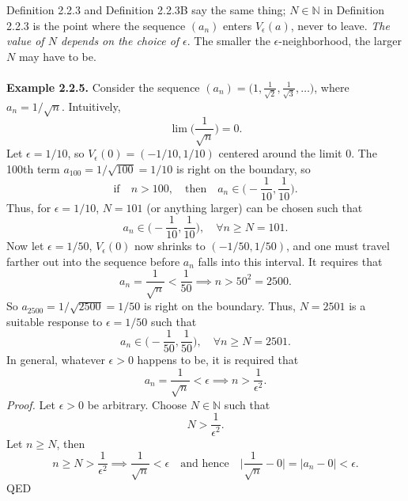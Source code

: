 \documentclass{article}
\begin{document}
            Definition 2.2.3 and Definition 2.2.3B say the same thing; $N \in \mathbb{N}$ in Definition 2.2.3 is the point where the sequence $(a_n)$ enters $V_\epsilon(a)$, never to leave. \textit{The value of $N$ depends on the choice of $\epsilon$}. The smaller the $\epsilon$-neighborhood, the larger $N$ may have to be.\\ \\
            \textbf{Example 2.2.5.} Consider the sequence $(a_n)=\big(1,\frac{1}{\sqrt{2}},\frac{1}{\sqrt{3}},\dots\big)$, where $a_n=1/\sqrt{n}$. Intuitively,
            \begin{equation*}
                \lim \bigg(\frac{1}{\sqrt{n}}\bigg) = 0.
            \end{equation*}
            Let $\epsilon=1/10$, so $V_\epsilon(0)=(-1/10,1/10)$ centered around the limit 0. The 100th term $a_{100} = 1/\sqrt{100}=1/10$ is right on the boundary, so
            \begin{equation*}
                \text{if} \quad n>100, \quad \text{then} \quad a_n \in \bigg(-\frac{1}{10},\frac{1}{10}\bigg).
            \end{equation*}
            Thus, for $\epsilon=1/10$, $N=101$ (or anything larger) can be chosen such that
            \begin{equation*}
                a_n \in \bigg(-\frac{1}{10},\frac{1}{10}\bigg), \quad \forall n \geq N = 101.
            \end{equation*}
            Now let $\epsilon=1/50$, $V_\epsilon(0)$ now shrinks to $(-1/50,1/50)$, and one must travel farther out into the sequence before $a_n$ falls into this interval. It requires that
            \begin{equation*}
                    a_n = \frac{1}{\sqrt{n}} < \frac{1}{50} \implies n>50^2=2500.
                \end{equation*}
                So $a_{2500} = 1/\sqrt{2500} = 1/50$ is right on the boundary. Thus, $N=2501$ is a suitable response to $\epsilon=1/50$ such that
                \begin{equation*}
                    a_n \in \bigg(-\frac{1}{50},\frac{1}{50}\bigg), \quad \forall n \geq N = 2501.
                \end{equation*}
                In general, whatever $\epsilon>0$ happens to be, it is required that
                \begin{equation*}
                    a_n = \frac{1}{\sqrt{n}}<\epsilon \implies n>\frac{1}{\epsilon^2}.
                \end{equation*}
                \textit{Proof.} Let $\epsilon>0$ be arbitrary. Choose $N \in \mathbb{N}$ such that
                \begin{equation*}
                    N>\frac{1}{\epsilon^2}.
                \end{equation*}
                Let $n\geq N$, then
                \begin{equation*}
                    n \geq N >\frac{1}{\epsilon^2} \implies \frac{1}{\sqrt{n}}<\epsilon \quad \text{and hence} \quad \bigg|\frac{1}{\sqrt{n}}-0\bigg|=|a_n-0|<\epsilon.
                \end{equation*}
                QED
            
\end{document}
